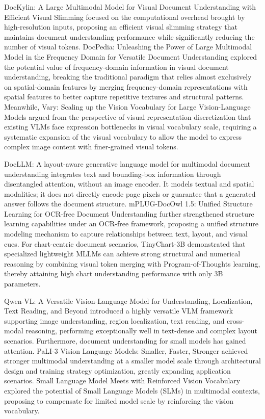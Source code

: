 DocKylin: A Large Multimodal Model for Visual Document Understanding with Efficient Visual Slimming \cite{liu2024dockylin} focused on the computational overhead brought by high-resolution inputs, proposing an efficient visual slimming strategy that maintains document understanding performance while significantly reducing the number of visual tokens. DocPedia: Unleashing the Power of Large Multimodal Model in the Frequency Domain for Versatile Document Understanding \cite{zhao2023docpedia} explored the potential value of frequency-domain information in visual document understanding, breaking the traditional paradigm that relies almost exclusively on spatial-domain features by merging frequency-domain representations with spatial features to better capture repetitive textures and structural patterns. Meanwhile, Vary: Scaling up the Vision Vocabulary for Large Vision-Language Models \cite{huang2023vary} argued from the perspective of visual representation discretization that existing VLMs face expression bottlenecks in visual vocabulary scale, requiring a systematic expansion of the visual vocabulary to allow the model to express complex image content with finer-grained visual tokens.

DocLLM: A layout-aware generative language model for multimodal document understanding \cite{wang2024docllm} integrates text and bounding-box information through disentangled attention, without an image encoder. It models textual and spatial modalities; it does not directly encode page pixels or guarantee that a generated answer follows the document structure.
mPLUG-DocOwl 1.5: Unified Structure Learning for OCR-free Document Understanding \cite{hu2024mplugdocowl15} further strengthened structure learning capabilities under an OCR-free framework, proposing a unified structure modeling mechanism to capture relationships between text, layout, and visual cues. For chart-centric document scenarios, TinyChart-3B \cite{zhang2024tinychart} demonstrated that specialized lightweight MLLMs can achieve strong structural and numerical reasoning by combining visual token merging with Program-of-Thoughts learning, thereby attaining high chart understanding performance with only 3B parameters.

Qwen-VL: A Versatile Vision-Language Model for Understanding, Localization, Text Reading, and Beyond \cite{bai2023qwenvl} introduced a highly versatile VLM framework supporting image understanding, region localization, text reading, and cross-modal reasoning, performing exceptionally well in text-dense and complex layout scenarios. Furthermore, document understanding for small models has gained attention. PaLI-3 Vision Language Models: Smaller, Faster, Stronger \cite{chen2023pali3} achieved stronger multimodal understanding at a smaller model scale through architectural design and training strategy optimization, greatly expanding application scenarios. Small Language Model Meets with Reinforced Vision Vocabulary \cite{li2024slmrvv} explored the potential of Small Language Models (SLMs) in multimodal contexts, proposing to compensate for limited model scale by reinforcing the vision vocabulary.

